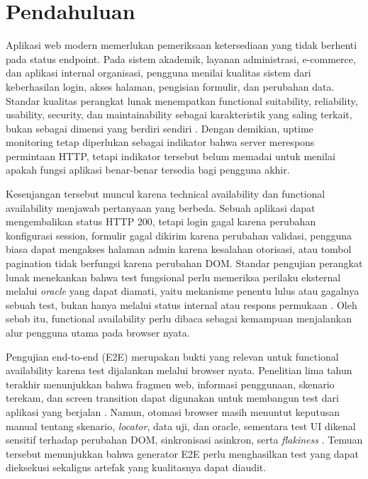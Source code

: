 \documentclass[conference]{IEEEtran}
\begin{document}
\section{Pendahuluan}

Aplikasi web modern memerlukan pemeriksaan ketersediaan yang tidak berhenti pada status endpoint. Pada sistem akademik, layanan administrasi, e-commerce, dan aplikasi internal organisasi, pengguna menilai kualitas sistem dari keberhasilan login, akses halaman, pengisian formulir, dan perubahan data. Standar kualitas perangkat lunak menempatkan functional suitability, reliability, usability, security, dan maintainability sebagai karakteristik yang saling terkait, bukan sebagai dimensi yang berdiri sendiri \cite{iso25010}. Dengan demikian, uptime monitoring tetap diperlukan sebagai indikator bahwa server merespons permintaan HTTP, tetapi indikator tersebut belum memadai untuk menilai apakah fungsi aplikasi benar-benar tersedia bagi pengguna akhir.

Kesenjangan tersebut muncul karena technical availability dan functional availability menjawab pertanyaan yang berbeda. Sebuah aplikasi dapat mengembalikan status HTTP 200, tetapi login gagal karena perubahan konfigurasi session, formulir gagal dikirim karena perubahan validasi, pengguna biasa dapat mengakses halaman admin karena kesalahan otorisasi, atau tombol pagination tidak berfungsi karena perubahan DOM. Standar pengujian perangkat lunak menekankan bahwa test fungsional perlu memeriksa perilaku eksternal melalui \textit{oracle} yang dapat diamati, yaitu mekanisme penentu lulus atau gagalnya sebuah test, bukan hanya melalui status internal atau respons permukaan \cite{iso29119}. Oleh sebab itu, functional availability perlu dibaca sebagai kemampuan menjalankan alur pengguna utama pada browser nyata.

Pengujian end-to-end (E2E) merupakan bukti yang relevan untuk functional availability karena test dijalankan melalui browser nyata. Penelitian lima tahun terakhir menunjukkan bahwa fragmen web, informasi penggunaan, skenario terekam, dan screen transition dapat digunakan untuk membangun test dari aplikasi yang berjalan \cite{garcia2021webusage,sunman2022automated,yandrapally2023fragment,le2025screen}. Namun, otomasi browser masih menuntut keputusan manual tentang skenario, \textit{locator}, data uji, dan oracle, sementara test UI dikenal sensitif terhadap perubahan DOM, sinkronisasi asinkron, serta \textit{flakiness} \cite{romano2021uiflaky,hashemi2022jsflaky,pei2023traf}. Temuan tersebut menunjukkan bahwa generator E2E perlu menghasilkan test yang dapat dieksekusi sekaligus artefak yang kualitasnya dapat diaudit.
\end{document}
